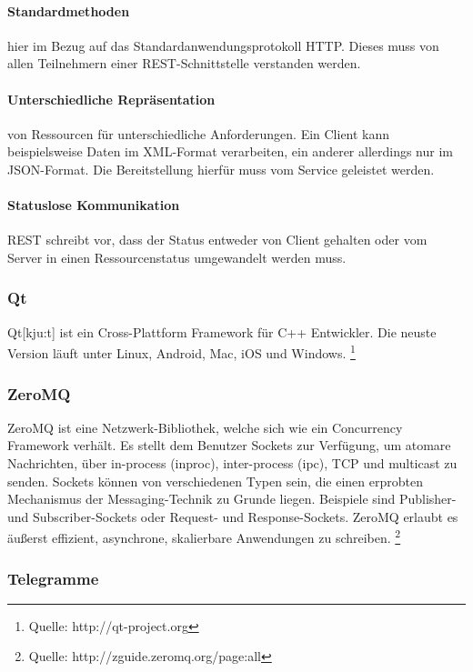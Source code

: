 \documentclass{article}
\begin{document}
\paragraph{Standardmethoden}

hier im Bezug auf das Standardanwendungsprotokoll HTTP. Dieses muss von allen Teilnehmern einer REST-Schnittstelle verstanden werden.

\paragraph{Unterschiedliche Repräsentation}

von Ressourcen für unterschiedliche Anforderungen. Ein Client kann beispielsweise Daten im XML-Format verarbeiten, ein anderer allerdings nur im JSON-Format. Die Bereitstellung hierfür muss vom Service geleistet werden.

\paragraph{Statuslose Kommunikation}

REST schreibt vor, dass der Status entweder von Client gehalten oder vom Server in einen Ressourcenstatus umgewandelt werden muss.

\subsubsection{Qt}

Qt[kju:t] ist ein Cross-Plattform Framework für C++ Entwickler. Die neuste Version läuft unter Linux, Android, Mac, iOS und Windows.
\footnote{Quelle: http://qt-project.org}

\subsubsection{ZeroMQ}

ZeroMQ ist eine Netzwerk-Bibliothek, welche sich wie ein Concurrency Framework verhält. Es stellt dem Benutzer Sockets zur Verfügung, um atomare Nachrichten, über in-process (inproc), inter-process (ipc), TCP und multicast zu senden. Sockets können von verschiedenen Typen sein, die einen erprobten Mechanismus der Messaging-Technik zu Grunde liegen. Beispiele sind Publisher- und Subscriber-Sockets oder Request- und Response-Sockets. ZeroMQ erlaubt es äußerst effizient, asynchrone, skalierbare Anwendungen zu schreiben.
\footnote{Quelle: http://zguide.zeromq.org/page:all}

\subsubsection{Telegramme}
\end{document}
